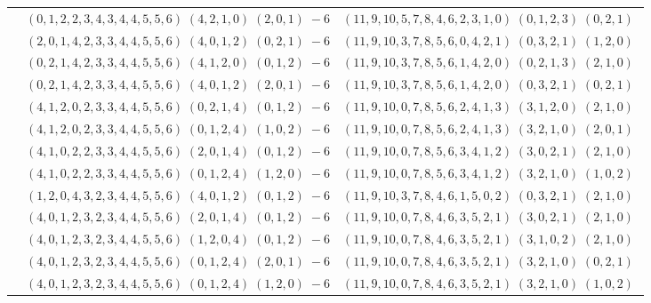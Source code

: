 \documentclass[11pt]{article}
\begin{document}
\begin{longtable}[l]{|c|c|c|}
 \cline{2-3} 
 & $(0 ,1 ,2 ,2 ,3 ,4 ,3 ,4 ,4 ,5 ,5 ,6) \;(4 ,2 ,1 ,0) \;(2 ,0 ,1) \;-6$ & $(11 ,9 ,10 ,5 ,7 ,8 ,4 ,6 ,2 ,3 ,1 ,0) \;(0 ,1 ,2 ,3) \;(0 ,2 ,1) \;$\\ 
 \cline{2-3} 
 & $(2 ,0 ,1 ,4 ,2 ,3 ,3 ,4 ,4 ,5 ,5 ,6) \;(4 ,0 ,1 ,2) \;(0 ,2 ,1) \;-6$ & $(11 ,9 ,10 ,3 ,7 ,8 ,5 ,6 ,0 ,4 ,2 ,1) \;(0 ,3 ,2 ,1) \;(1 ,2 ,0) \;$\\ 
 \cline{2-3} 
 & $(0 ,2 ,1 ,4 ,2 ,3 ,3 ,4 ,4 ,5 ,5 ,6) \;(4 ,1 ,2 ,0) \;(0 ,1 ,2) \;-6$ & $(11 ,9 ,10 ,3 ,7 ,8 ,5 ,6 ,1 ,4 ,2 ,0) \;(0 ,2 ,1 ,3) \;(2 ,1 ,0) \;$\\ 
 \cline{2-3} 
 & $(0 ,2 ,1 ,4 ,2 ,3 ,3 ,4 ,4 ,5 ,5 ,6) \;(4 ,0 ,1 ,2) \;(2 ,0 ,1) \;-6$ & $(11 ,9 ,10 ,3 ,7 ,8 ,5 ,6 ,1 ,4 ,2 ,0) \;(0 ,3 ,2 ,1) \;(0 ,2 ,1) \;$\\ 
 \cline{2-3} 
 & $(4 ,1 ,2 ,0 ,2 ,3 ,3 ,4 ,4 ,5 ,5 ,6) \;(0 ,2 ,1 ,4) \;(0 ,1 ,2) \;-6$ & $(11 ,9 ,10 ,0 ,7 ,8 ,5 ,6 ,2 ,4 ,1 ,3) \;(3 ,1 ,2 ,0) \;(2 ,1 ,0) \;$\\ 
 \cline{2-3} 
 & $(4 ,1 ,2 ,0 ,2 ,3 ,3 ,4 ,4 ,5 ,5 ,6) \;(0 ,1 ,2 ,4) \;(1 ,0 ,2) \;-6$ & $(11 ,9 ,10 ,0 ,7 ,8 ,5 ,6 ,2 ,4 ,1 ,3) \;(3 ,2 ,1 ,0) \;(2 ,0 ,1) \;$\\ 
 \cline{2-3} 
 & $(4 ,1 ,0 ,2 ,2 ,3 ,3 ,4 ,4 ,5 ,5 ,6) \;(2 ,0 ,1 ,4) \;(0 ,1 ,2) \;-6$ & $(11 ,9 ,10 ,0 ,7 ,8 ,5 ,6 ,3 ,4 ,1 ,2) \;(3 ,0 ,2 ,1) \;(2 ,1 ,0) \;$\\ 
 \cline{2-3} 
 & $(4 ,1 ,0 ,2 ,2 ,3 ,3 ,4 ,4 ,5 ,5 ,6) \;(0 ,1 ,2 ,4) \;(1 ,2 ,0) \;-6$ & $(11 ,9 ,10 ,0 ,7 ,8 ,5 ,6 ,3 ,4 ,1 ,2) \;(3 ,2 ,1 ,0) \;(1 ,0 ,2) \;$\\ 
 \cline{2-3} 
 & $(1 ,2 ,0 ,4 ,3 ,2 ,3 ,4 ,4 ,5 ,5 ,6) \;(4 ,0 ,1 ,2) \;(0 ,1 ,2) \;-6$ & $(11 ,9 ,10 ,3 ,7 ,8 ,4 ,6 ,1 ,5 ,0 ,2) \;(0 ,3 ,2 ,1) \;(2 ,1 ,0) \;$\\ 
 \cline{2-3} 
 & $(4 ,0 ,1 ,2 ,3 ,2 ,3 ,4 ,4 ,5 ,5 ,6) \;(2 ,0 ,1 ,4) \;(0 ,1 ,2) \;-6$ & $(11 ,9 ,10 ,0 ,7 ,8 ,4 ,6 ,3 ,5 ,2 ,1) \;(3 ,0 ,2 ,1) \;(2 ,1 ,0) \;$\\ 
 \cline{2-3} 
 & $(4 ,0 ,1 ,2 ,3 ,2 ,3 ,4 ,4 ,5 ,5 ,6) \;(1 ,2 ,0 ,4) \;(0 ,1 ,2) \;-6$ & $(11 ,9 ,10 ,0 ,7 ,8 ,4 ,6 ,3 ,5 ,2 ,1) \;(3 ,1 ,0 ,2) \;(2 ,1 ,0) \;$\\ 
 \cline{2-3} 
 & $(4 ,0 ,1 ,2 ,3 ,2 ,3 ,4 ,4 ,5 ,5 ,6) \;(0 ,1 ,2 ,4) \;(2 ,0 ,1) \;-6$ & $(11 ,9 ,10 ,0 ,7 ,8 ,4 ,6 ,3 ,5 ,2 ,1) \;(3 ,2 ,1 ,0) \;(0 ,2 ,1) \;$\\ 
 \cline{2-3} 
 & $(4 ,0 ,1 ,2 ,3 ,2 ,3 ,4 ,4 ,5 ,5 ,6) \;(0 ,1 ,2 ,4) \;(1 ,2 ,0) \;-6$ & $(11 ,9 ,10 ,0 ,7 ,8 ,4 ,6 ,3 ,5 ,2 ,1) \;(3 ,2 ,1 ,0) \;(1 ,0 ,2) \;$\\ 

\end{longtable}
\end{document}
